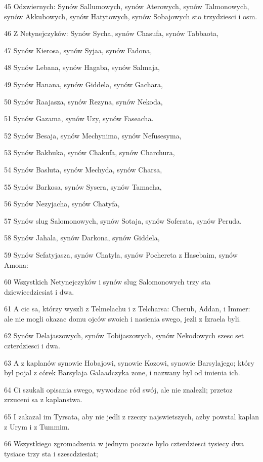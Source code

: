 \par 45 Odzwiernych: Synów Sallumowych, synów Aterowych, synów Talmonowych, synów Akkubowych, synów Hatytowych, synów Sobajowych sto trzydziesci i osm.
\par 46 Z Netynejczyków: Synów Sycha, synów Chasufa, synów Tabbaota,
\par 47 Synów Kierosa, synów Syjaa, synów Fadona,
\par 48 Synów Lebana, synów Hagaba, synów Salmaja,
\par 49 Synów Hanana, synów Giddela, synów Gachara,
\par 50 Synów Raajasza, synów Rezyna, synów Nekoda,
\par 51 Synów Gazama, synów Uzy, synów Faseacha.
\par 52 Synów Besaja, synów Mechynima, synów Nefusesyma,
\par 53 Synów Bakbuka, synów Chakufa, synów Charchura,
\par 54 Synów Basluta, synów Mechyda, synów Charsa,
\par 55 Synów Barkosa, synów Sysera, synów Tamacha,
\par 56 Synów Nezyjacha, synów Chatyfa,
\par 57 Synów slug Salomonowych, synów Sotaja, synów Soferata, synów Peruda.
\par 58 Synów Jahala, synów Darkona, synów Giddela,
\par 59 Synów Sefatyjasza, synów Chatyla, synów Pochereta z Hasebaim, synów Amona:
\par 60 Wszystkich Netynejczyków i synów slug Salomonowych trzy sta dziewiecdziesiat i dwa.
\par 61 A cic sa, którzy wyszli z Telmelachu i z Telcharsa: Cherub, Addan, i Immer: ale nie mogli okazac domu ojców swoich i nasienia swego, jezli z Izraela byli.
\par 62 Synów Delajaszowych, synów Tobijaszowych, synów Nekodowych szesc set czterdziesci i dwa.
\par 63 A z kaplanów synowie Hobajowi, synowie Kozowi, synowie Barsylajego; który byl pojal z córek Barsylaja Galaadczyka zone, i nazwany byl od imienia ich.
\par 64 Ci szukali opisania swego, wywodzac ród swój, ale nie znalezli; przetoz zrzuceni sa z kaplanstwa.
\par 65 I zakazal im Tyrsata, aby nie jedli z rzeczy najswietszych, azby powstal kaplan z Urym i z Tummim.
\par 66 Wszystkiego zgromadzenia w jednym poczcie bylo czterdziesci tysiecy dwa tysiace trzy sta i szescdziesiat;

